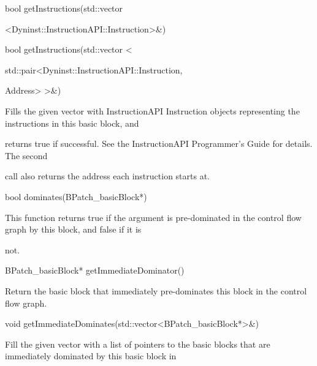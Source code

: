{

bool getInstructions(std::vector}



{

<Dyninst::InstructionAPI::Instruction>&)}



{

bool getInstructions(std::vector <}



{

std::pair<Dyninst::InstructionAPI::Instruction,



{

Address> >&)}



{

Fills the given vector with InstructionAPI Instruction objects representing the instructions in this basic block, and

returns true if successful. See the InstructionAPI Programmer's Guide for details. The second

call also returns the address each instruction starts at.



{

bool dominates(BPatch_basicBlock*)}



{

This function returns true if the argument is pre-dominated in the control flow graph by this block, and false if it is

not.}



{

BPatch_basicBlock* getImmediateDominator()}



{

Return the basic block that immediately pre-dominates this block in the control flow graph.}



{

void getImmediateDominates(std::vector<BPatch_basicBlock*>&)}



{

Fill the given vector with a list of pointers to the basic blocks that are immediately dominated by this basic block in

}}}
